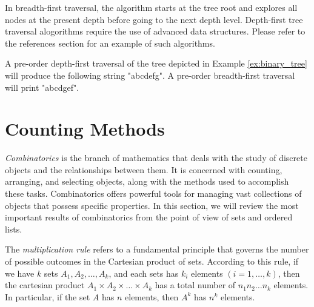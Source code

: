 In breadth-first traversal, the algorithm starts at the tree root and explores all nodes at the present depth before going to the next depth level. Depth-first tree traversal alogorithms require the use of advanced data structures. Please refer to the references section for an example of such algorithms.

\begin{example}
A pre-order depth-first traversal of the tree depicted in Example \ref{ex:binary_tree} will produce the following string "abcdefg". A pre-order breadth-first traversal will print "abcdgef".
\end{example}

%
%

\section{Counting Methods}
\label{sec:counting}

\emph{Combinatorics} is the branch of mathematics that deals with the study of discrete objects and the relationships between them. It is concerned with counting, arranging, and selecting objects, along with the methods used to accomplish these tasks. Combinatorics offers powerful tools for managing vast collections of objects that possess specific properties. In this section, we will review the most important results of combinatorics from the point of view of sets and ordered lists.

The \emph{multiplication rule} refers to a fundamental principle that governs the number of possible outcomes in the Cartesian product of sets. According to this rule, if we have $k$ sets $A_1, A_2, \ldots, A_k$, and each sets has $k_i$ elements $\left( i=1, \ldots, k \right)$, then the cartesian product $A_1 \times A_2 \times \ldots \times A_k$ has a total number of $n_1 n_2 \ldots n_k$ elements. In particular, if the set $A$ has $n$ elements, then $A^k$ has $n^k$ elements.

